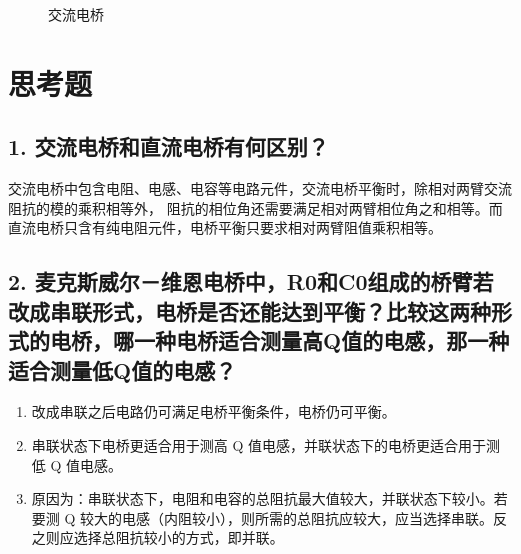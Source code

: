 \documentclass[12pt,a4paper,UTF8]{ctexart}
\begin{document}
\begin{figure}[htbp]
    \centering

    \caption{交流电桥}
    \label{fig:3}
\end{figure}

\section*{思考题}
\subsection*{1. 交流电桥和直流电桥有何区别？}
交流电桥中包含电阻、电感、电容等电路元件，交流电桥平衡时，除相对两臂交流阻抗的模的乘积相等外，
阻抗的相位角还需要满足相对两臂相位角之和相等。而直流电桥只含有纯电阻元件，电桥平衡只要求相对两臂阻值乘积相等。
\subsection*{2. 麦克斯威尔－维恩电桥中，R0和C0组成的桥臂若改成串联形式，电桥是否还能达到平衡？比较这两种形式的电桥，哪一种电桥适合测量高Q值的电感，那一种适合测量低Q值的电感？}
\begin{enumerate}[label=\arabic*.]
    \item 改成串联之后电路仍可满足电桥平衡条件，电桥仍可平衡。
    \item 串联状态下电桥更适合用于测高 Q 值电感，并联状态下的电桥更适合用于测低 Q 值电感。
    \item 原因为：串联状态下，电阻和电容的总阻抗最大值较大，并联状态下较小。若要测 Q 较大的电感（内阻较小），则所需的总阻抗应较大，应当选择串联。反之则应选择总阻抗较小的方式，即并联。
\end{enumerate}
\end{document}
